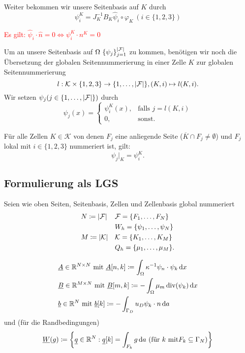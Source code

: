 Weiter bekommen wir unsere Seitenbasis auf $ K $ durch 
\[ \psi_i^K = J_K^{-1}B_K \hat{\psi}_i \circ \varphi_K \ (i\in \{1,2,3\}) \]
\begin{remark}
	\textcolor{red}{Es gilt: $ \hat{\psi}_i \cdot \hat{n} = 0 \iff \psi_i^K \cdot n^K = 0 $}
\end{remark}
Um  an unsere Seitenbasis auf $ \Omega \ \{\psi_j\}_{j = 1}^{\abs{\mathcal{F}}}$ zu kommen, benötigen wir noch die Übersetzung der globalen Seitennummerierung in einer Zelle $ K $ zur globalen Seitennummerierung
\[ l:\mathcal{K}\times \{1,2,3\} \to \{1, \dots , \abs{\mathcal{F}} \}, (K,i) \mapsto l(K,i). \]
Wir setzen $ \psi_j (j \in \{1,\dots , \abs{\mathcal{F}}\})$ durch
\[ \psi_j(x) = 
\begin{cases}
	\psi_i^K(x) , &\text{falls } j = l(K,i)\\
	0,			  &\text{sonst}.
\end{cases} \]
\begin{remark}
	Für alle Zellen $ K \in \mathcal{K} $ von denen $ F_j $ eine anliegende Seite ($ \overline{K} \cap F_j \ne \emptyset $) und $ F_j $ lokal mit $ i \in \{1,2,3\} $ nummeriert ist, gilt:
	\[ \psi_j|_K = \psi_i^K. \]
\end{remark}

\subsection{Formulierung als LGS}
Seien wie oben Seiten, Seitenbasis, Zellen und Zellenbasis global nummeriert 
\begin{align*}
&N \coloneqq \abs{\mathcal{F}} &&\mathcal{F} = \{F_1, \dots , F_{N} \}  \\
&&&W_h =\{\psi_1, \dots , \psi_N\}\\
&M \coloneqq \abs{\mathcal{K}} &&\mathcal{K} = \{K_1, \dots , K_{M} \}  \\
&&&Q_h = \{\mu_1 , \dots , \mu_M  \}.
\end{align*}

\begin{define}
	\begin{align*}
		&\underline{A} \in \mathbb{R}^{N \times N} \text{ mit } \underline{A}[n,k] \coloneqq \int_{\Omega} \kappa^{-1} \psi_n \cdot \psi_k \mathop{}\!\mathrm{d} x \\
		&\underline{B} \in \mathbb{R}^{M \times N} \text{ mit } \underline{B}[m,k] \coloneqq - \int_{\Omega} \mu_m \operatorname{div}(\psi_k) \mathop{}\!\mathrm{d} x \\
		&\underline{b} \in \mathbb{R}^N \text{ mit } \underline{b}[k] \coloneqq - \int_{\Gamma_D} u_D \psi_k \cdot n \mathop{}\!\mathrm{d} a
	\end{align*}
	und (für die Randbedingungen)
	\begin{gather*}
		\underline{W}(g) \coloneqq \left\{ \underline{q} \in \mathbb{R}^N : \underline{q}[k] = \int_{F_k} g  \mathop{}\!\mathrm{d} a \ (\text{für } k \text{ mit} F_k \subseteq \Gamma_N) \right\} 
	\end{gather*}
\end{define}

